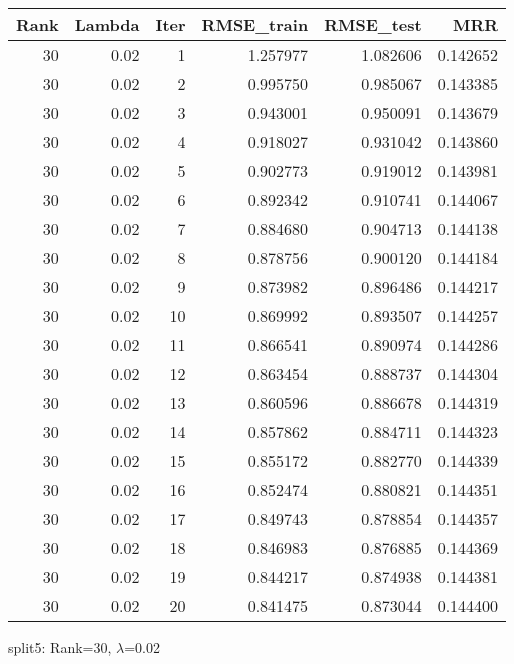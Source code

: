 \begin{tabular}{rrrrrr}
\toprule
 Rank &  Lambda &  Iter &  RMSE\_train &  RMSE\_test &       MRR \\
\midrule
   30 &    0.02 &     1 &    1.257977 &   1.082606 &  0.142652 \\
   30 &    0.02 &     2 &    0.995750 &   0.985067 &  0.143385 \\
   30 &    0.02 &     3 &    0.943001 &   0.950091 &  0.143679 \\
   30 &    0.02 &     4 &    0.918027 &   0.931042 &  0.143860 \\
   30 &    0.02 &     5 &    0.902773 &   0.919012 &  0.143981 \\
   30 &    0.02 &     6 &    0.892342 &   0.910741 &  0.144067 \\
   30 &    0.02 &     7 &    0.884680 &   0.904713 &  0.144138 \\
   30 &    0.02 &     8 &    0.878756 &   0.900120 &  0.144184 \\
   30 &    0.02 &     9 &    0.873982 &   0.896486 &  0.144217 \\
   30 &    0.02 &    10 &    0.869992 &   0.893507 &  0.144257 \\
   30 &    0.02 &    11 &    0.866541 &   0.890974 &  0.144286 \\
   30 &    0.02 &    12 &    0.863454 &   0.888737 &  0.144304 \\
   30 &    0.02 &    13 &    0.860596 &   0.886678 &  0.144319 \\
   30 &    0.02 &    14 &    0.857862 &   0.884711 &  0.144323 \\
   30 &    0.02 &    15 &    0.855172 &   0.882770 &  0.144339 \\
   30 &    0.02 &    16 &    0.852474 &   0.880821 &  0.144351 \\
   30 &    0.02 &    17 &    0.849743 &   0.878854 &  0.144357 \\
   30 &    0.02 &    18 &    0.846983 &   0.876885 &  0.144369 \\
   30 &    0.02 &    19 &    0.844217 &   0.874938 &  0.144381 \\
   30 &    0.02 &    20 &    0.841475 &   0.873044 &  0.144400 \\
\bottomrule
\end{tabular}

\caption{split5: Rank=30, $\lambda$=0.02}
